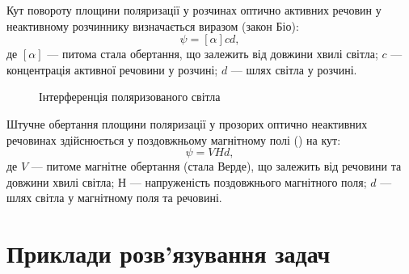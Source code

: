 Кут повороту площини поляризації у розчинах оптично активних
речовин у неактивному розчиннику визначається виразом (закон Біо):
\begin{equation}\label{eq:Bio}
    \psi = [\alpha] cd,
\end{equation}
де $ [\alpha] $ --- питома стала обертання, що залежить від довжини хвилі світла; $ c $ --- концентрація активної речовини у розчині; $ d $ --- шлях світла у розчині.

\begin{figure}[h!]\centering

\caption{Інтерференція поляризованого світла}
\label{pic:polarisation_plane_rotation}
\end{figure}

Штучне обертання площини поляризації у прозорих оптично
неактивних речовинах здійснюється у поздовжньому магнітному полі
() на кут:
\begin{equation}\label{eq:Faraday_effect}
    \psi = VHd,
\end{equation}
де $ V $ --- питоме магнітне обертання (стала Верде), що залежить від речовини
та довжини хвилі світла; $ Н $ --- напруженість поздовжнього магнітного поля;
$ d $ --- шлях світла у магнітному поля та речовині.



\section{Приклади розв’язування задач}


